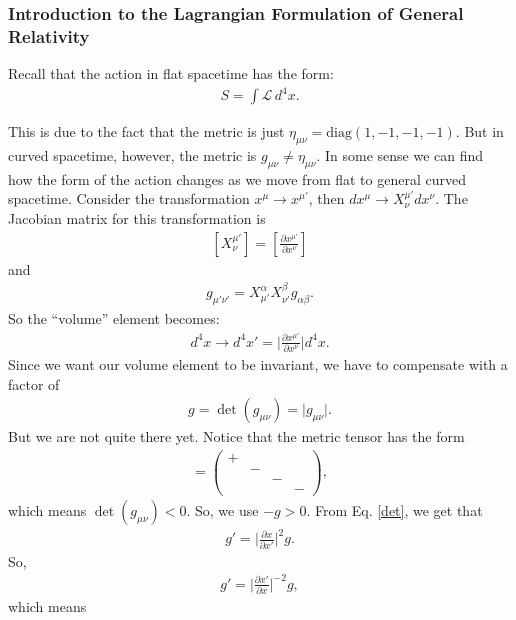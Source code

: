\documentclass[a4paper,11pt]{article}
\numberwithin{equation}{section}
\theoremstyle{definition}
\newcommand{\p}{\partial}
\newcommand{\lag}{\mathcal{L}}
\newcommand{\f}[2]{\frac{#1}{#2}}
\newcommand{\lb}{\left[}
\newcommand{\rb}{\right]}
\begin{document}
\subsubsection{Introduction to the Lagrangian Formulation of General Relativity}

Recall that the action in flat spacetime has the form:
\begin{align}
S = \int \lag \,d^4x.
\end{align}

This is due to the fact that the metric is just $\eta_{\mu\nu} = \text{diag}(1,-1,-1,-1)$. But in curved spacetime, however, the metric is $g_{\mu\nu} \neq \eta_{\mu\nu}$. In some sense we can find how the form of the action changes as we move from flat to general curved spacetime. Consider the transformation $x^\mu \to x^{\mu'}$, then $dx^\mu \to X^{\mu'}_\nu dx^\nu$. The Jacobian matrix for this transformation is 
\begin{align}
\lb X^{\mu'}_\nu \rb = \lb\f{\p x^{\mu'}}{\p x^\nu}\rb
\end{align} 
and
\begin{align}
g_{\mu'\nu'} = X^\alpha_{\mu'}X^\beta_{\nu'}g_{\alpha\beta}.
\end{align}
So the ``volume'' element becomes:
\begin{align}
d^4x \to  d^4x' = \bigg\vert \f{\p x^{\mu'}}{\p x^\nu}  \bigg\vert d^4x.
\end{align}
Since we want our volume element to be invariant, we have to compensate with a factor of 
\begin{align}\label{det}
g = \det(g_{\mu\nu}) = \vert g_{\mu\nu} \vert.
\end{align}
But we are not quite there yet. Notice that the metric tensor has the form
\begin{align}
[g_{\mu\nu}] = \begin{pmatrix}
+ &&&\\
&-&&\\
&&-&\\
&&&-
\end{pmatrix},
\end{align}
which means $\det(g_{\mu\nu}) < 0$. So, we use $-g > 0$. From Eq. \eqref{det}, we get that 
\begin{align}
g' = \bigg\vert \f{\p x}{\p x'} \bigg\vert^2 g.
\end{align}
So,
\begin{align}
g' = \bigg\vert \f{\p x'}{\p x} \bigg\vert^{-2} g,
\end{align}
which means
\end{document}
